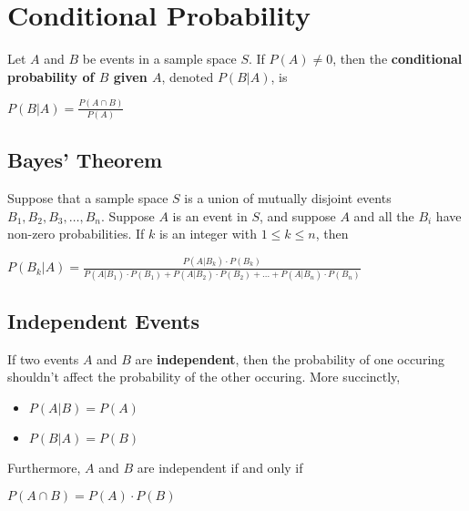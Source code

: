 \documentclass[a4paper]{article}
\begin{document}
\section{Conditional Probability}
Let $A$ and $B$ be events in a sample space $S$. If $P(A) \neq 0$, then the \textbf{conditional probability of $B$ given $A$}, denoted $P(B|A)$, is 
\begin{center}
	$P(B|A) = \frac{P(A\cap B)}{P(A)}$
\end{center}

\subsection{Bayes' Theorem}
Suppose that a sample space $S$ is a union of mutually disjoint events $B_1,B_2,B_3,\dots,B_n$. Suppose $A$ is an event in $S$, and suppose $A$ and all the $B_i$ have non-zero probabilities. If $k$ is an integer with $1\le k\le n$, then
\begin{center}
	$P(B_k|A) = \frac{P(A|B_k)\cdot P(B_k)}{P(A|B_1)\cdot P(B_1) + P(A|B_2)\cdot P(B_2)+\dots+P(A|B_n)\cdot P(B_n)}$
\end{center}

\subsection{Independent Events}
If two events $A$ and $B$ are \textbf{independent}, then the probability of one occuring shouldn't affect the probability of the other occuring. More succinctly,
\begin{itemize}
	\item[] $P(A|B) = P(A)$
	\item[] $P(B|A) = P(B)$
\end{itemize}
Furthermore, $A$ and $B$ are independent if and only if
\begin{center}
	$P(A\cap B) = P(A) \cdot P(B)$
\end{center}
\end{document}
